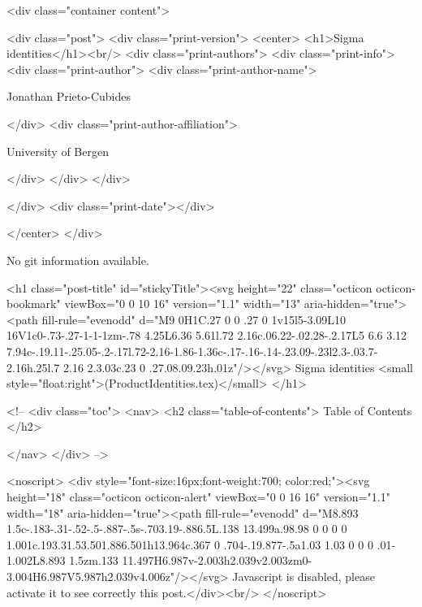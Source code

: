       <div class="container content">
        







<div class="post">
  <div class="print-version">
    <center>
      <h1>Sigma identities</h1><br/>
        <div class="print-authors">
          <div class="print-info">
            <div class="print-author">
              <div class="print-author-name">
                
                  Jonathan Prieto-Cubides
                
              </div>
              <div class="print-author-affiliation">
                
                  University of Bergen
                
                </div>
            </div>
          </div>
          
          
        </div>
        <div class="print-date"></div>
        
        
    </center>
  </div>

  
  No git information available.
  

  <h1 class="post-title" id="stickyTitle"><svg height="22" class="octicon octicon-bookmark" viewBox="0 0 10 16" version="1.1" width="13" aria-hidden="true"><path fill-rule="evenodd" d="M9 0H1C.27 0 0 .27 0 1v15l5-3.09L10 16V1c0-.73-.27-1-1-1zm-.78 4.25L6.36 5.61l.72 2.16c.06.22-.02.28-.2.17L5 6.6 3.12 7.94c-.19.11-.25.05-.2-.17l.72-2.16-1.86-1.36c-.17-.16-.14-.23.09-.23l2.3-.03.7-2.16h.25l.7 2.16 2.3.03c.23 0 .27.08.09.23h.01z"/></svg> Sigma identities <small style="float:right">(ProductIdentities.tex)</small>
  </h1>

  <!-- 
  <div class="toc">
    <nav>
    <h2 class="table-of-contents"> Table of Contents </h2>
      

    </nav>
  </div>
   -->

  <noscript>
  <div style="font-size:16px;font-weight:700; color:red;"><svg height="18" class="octicon octicon-alert" viewBox="0 0 16 16" version="1.1" width="18" aria-hidden="true"><path fill-rule="evenodd" d="M8.893 1.5c-.183-.31-.52-.5-.887-.5s-.703.19-.886.5L.138 13.499a.98.98 0 0 0 0 1.001c.193.31.53.501.886.501h13.964c.367 0 .704-.19.877-.5a1.03 1.03 0 0 0 .01-1.002L8.893 1.5zm.133 11.497H6.987v-2.003h2.039v2.003zm0-3.004H6.987V5.987h2.039v4.006z"/></svg> Javascript is disabled, please activate it to see correctly this post.</div><br/>
  </noscript>

